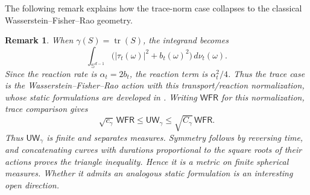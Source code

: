 \documentclass{article}
\newtheorem{remark}[theorem]{Remark}
\newcommand{\Sd}{\mathbb{S}^{d-1}}
\newcommand{\UWg}{\mathsf{UW}_{\gamma}}
\newcommand{\tr}{\operatorname{tr}}
\newcommand{\abs}[1]{\left\lvert #1 \right\rvert}
\begin{document}
The following remark explains how the trace-norm case collapses to the classical Wasserstein--Fisher--Rao geometry.
\begin{remark}
When $\gamma(S)=\tr(S)$, the integrand becomes
$$
\int_{\Sd}\bigl(\abs{\tau_t(\omega)}^2+b_t(\omega)^2\bigr)\,d\nu_t(\omega).
$$
Since the reaction rate is $\alpha_t=2b_t$, the reaction term is
$\alpha_t^2/4$. Thus the trace case is the Wasserstein--Fisher--Rao action
with this transport/reaction normalization, whose static formulations are
developed in \citet{ChizatPeyreSchmitzerVialard2018,LieroMielkeSavare2018}.
Writing $\mathsf{WFR}$ for this normalization, trace comparison gives
\[
 \sqrt{c_\gamma}\,\mathsf{WFR}\le\UWg
 \le\sqrt{C_\gamma}\,\mathsf{WFR}.
\]
Thus $\UWg$ is finite and separates measures. Symmetry follows by reversing
time, and concatenating curves with durations proportional to the square
roots of their actions proves the triangle inequality. Hence it is a metric
on finite spherical measures. Whether it admits an analogous static
formulation is an interesting open direction.
\end{remark}





\clearpage

\end{document}
